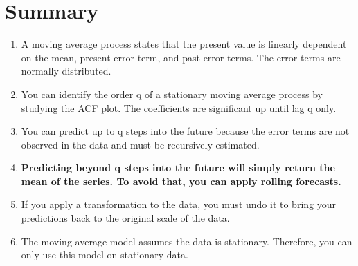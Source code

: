 \section*{Summary}
\begin{enumerate}
    \item A moving average process states that the present value is linearly dependent on the mean, present error term, and past error terms. The error terms are normally distributed.
    \item You can identify the order q of a stationary moving average process by studying the ACF plot. The coefficients are significant up until lag q only.
    \item You can predict up to q steps into the future because the error terms are not observed in the data and must be recursively estimated.
    \item \textbf{Predicting beyond q steps into the future will simply return the mean of the series. To avoid that, you can apply rolling forecasts.}
    \item If you apply a transformation to the data, you must undo it to bring your predictions back to the original scale of the data.
    \item The moving average model assumes the data is stationary. Therefore, you can only use this model on stationary data.
\end{enumerate}